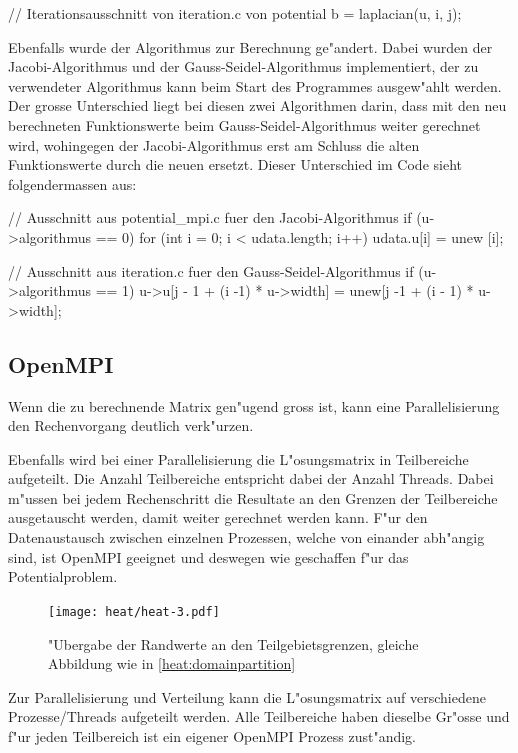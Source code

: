 \begin{refsection}
	\begin{code}
	// Iterationsausschnitt von iteration.c von potential
		b = laplacian(u, i, j);	\end{code}	
Ebenfalls wurde der Algorithmus zur Berechnung ge"andert. Dabei wurden
der Jacobi-Algorithmus und der Gauss-Seidel-Algorithmus implementiert,
der zu verwendeter Algorithmus kann beim Start des Programmes ausgew"ahlt
werden. Der grosse Unterschied liegt bei diesen zwei Algorithmen darin,
dass mit den neu berechneten Funktionswerte beim Gauss-Seidel-Algorithmus
weiter gerechnet wird, wohingegen der Jacobi-Algorithmus erst am Schluss
die alten Funktionswerte durch die neuen ersetzt. Dieser Unterschied im
Code sieht folgendermassen aus:
			
	\begin{code}
	// Ausschnitt aus potential_mpi.c fuer den Jacobi-Algorithmus
	if (u->algorithmus == 0)  {
		for (int i = 0; i < udata.length; i++)	{
			udata.u[i] = unew [i];
		}
	}\end{code}
					
	\begin{code}
	// Ausschnitt aus iteration.c fuer den Gauss-Seidel-Algorithmus
	if (u->algorithmus == 1)  {
		u->u[j - 1 + (i -1) * u->width] = unew[j -1 + (i - 1) * u->width];
	}\end{code}	
			
		
\subsection{OpenMPI}	
Wenn die zu berechnende Matrix gen"ugend gross ist, kann eine
Parallelisierung den Rechenvorgang deutlich verk"urzen.

Ebenfalls wird bei einer Parallelisierung die L"osungsmatrix in
Teilbereiche aufgeteilt. Die Anzahl Teilbereiche entspricht dabei der
Anzahl Threads. Dabei m"ussen bei jedem Rechenschritt die Resultate an
den Grenzen der Teilbereiche ausgetauscht werden, damit weiter gerechnet
werden kann. F"ur den Datenaustausch zwischen einzelnen Prozessen,
welche von einander abh"angig sind, ist OpenMPI geeignet und deswegen
wie geschaffen f"ur das Potentialproblem.
				 
	 
\begin{figure}[h] 
\centering 
\texttt{[image: heat/heat-3.pdf]}
\caption{"Ubergabe der Randwerte an den Teilgebietsgrenzen, gleiche Abbildung wie in \ref{heat:domainpartition}}
\end{figure}

Zur Parallelisierung und Verteilung kann die L"osungsmatrix
auf verschiedene Prozesse/Threads aufgeteilt werden. Alle Teilbereiche
haben dieselbe Gr"osse und f"ur jeden Teilbereich ist ein eigener OpenMPI
Prozess zust"andig. 
		

\end{refsection}
